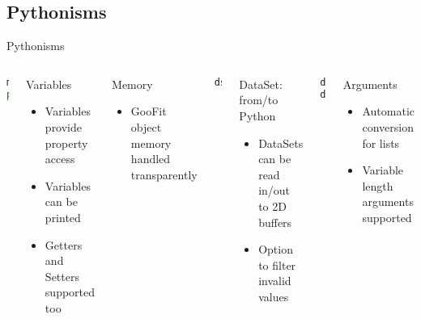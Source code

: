 \documentclass[aspectratio=169, smaller]{beamer}
\begin{document}
\subsection{Pythonisms}
\begin{frame}[fragile]{Pythonisms}
    \begin{columns}[c]
        \begin{lstlisting}[language=Python]
mu.value = 2
print(mu)
        \end{lstlisting}
        \begin{block}{Variables}
            \begin{itemize}
                \item Variables provide property access
                \item Variables can be printed
                \item Getters and Setters supported too
            \end{itemize}
        \end{block}
        \begin{block}{Memory}
            \begin{itemize}
                \item GooFit object memory handled transparently
            \end{itemize}
        \end{block}
        \begin{lstlisting}[language=Python]
ds.from_matrix(numpydata, filter=True)
        \end{lstlisting}
        \begin{block}{DataSet: from/to Python}
            \begin{itemize}
                \item DataSets can be read in/out to 2D buffers
                \item Option to filter invalid values
            \end{itemize}
        \end{block}
        \begin{lstlisting}[language=Python]
ds = BinnedDataSet(x, y, z)
ds.addEvent(xval, yval, zval)
        \end{lstlisting}
        \begin{block}{Arguments}
            \begin{itemize}
                \item Automatic conversion for lists
                \item Variable length arguments supported
            \end{itemize}
        \end{block}
    \end{columns}
\end{frame}
\end{document}
